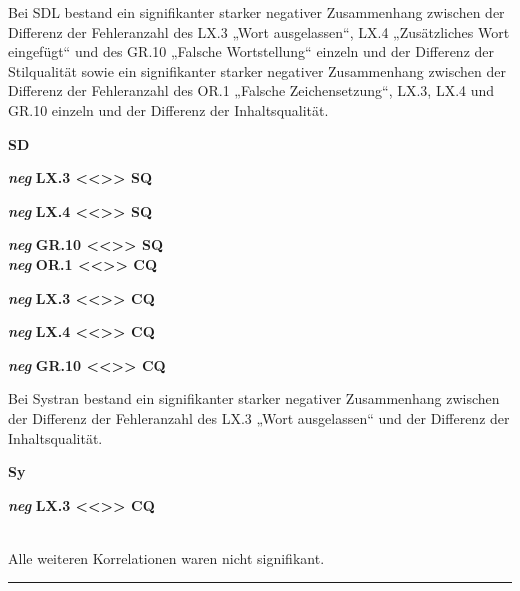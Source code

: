 \medskip
\noindent
\parbox[t]{.7\textwidth}{
Bei SDL bestand ein signifikanter starker negativer Zusammenhang zwischen der Differenz der Fehleranzahl des LX.3 „Wort ausgelassen“, LX.4 „Zusätzliches Wort eingefügt“ und des GR.10 „Falsche Wortstellung“ einzeln und der Differenz der Stilqualität sowie ein signifikanter starker negativer Zusammenhang zwischen der Differenz der Fehleranzahl des OR.1 „Falsche Zeichensetzung“, LX.3, LX.4 und GR.10 einzeln und der Differenz der Inhaltsqualität.
}
\parbox[t]{.04\textwidth}{}
\colorbox{smGreen}{\parbox[t]{.25\textwidth}{
{ \textbf{SD}}

{ \textbf{\textit{neg}} \textbf{LX.3 <{}<{}>{}> SQ}}

{ \textbf{\textit{neg}} \textbf{LX.4 <{}<{}>{}> SQ}}

{ \textbf{\textit{neg}} \textbf{GR.10 <{}<{}>{}> SQ}}\\

{ \textbf{\textit{neg}} \textbf{OR.1 <{}<{}>{}> CQ}}

{ \textbf{\textit{neg}} \textbf{LX.3 <{}<{}>{}> CQ}}

{ \textbf{\textit{neg}} \textbf{LX.4 <{}<{}>{}> CQ}}

{ \textbf{\textit{neg}} \textbf{GR.10 <{}<{}>{}> CQ}}
}}

\medskip
\noindent
\parbox[t]{.7\textwidth}{
Bei Systran bestand ein signifikanter starker negativer Zusammenhang zwischen der Differenz der Fehleranzahl des LX.3 „Wort ausgelassen“ und der Differenz der Inhaltsqualität.
}
\parbox[t]{.04\textwidth}{}
\colorbox{smGreen}{\parbox[t]{.25\textwidth}{
{ \textbf{Sy}}

{ \textbf{\textit{neg}} \textbf{LX.3 <{}<{}>{}> CQ}}\\
\\
}}

\medskip
\noindent
\parbox[t]{.7\textwidth}{
Alle weiteren Korrelationen waren nicht signifikant.
}

\hrule
